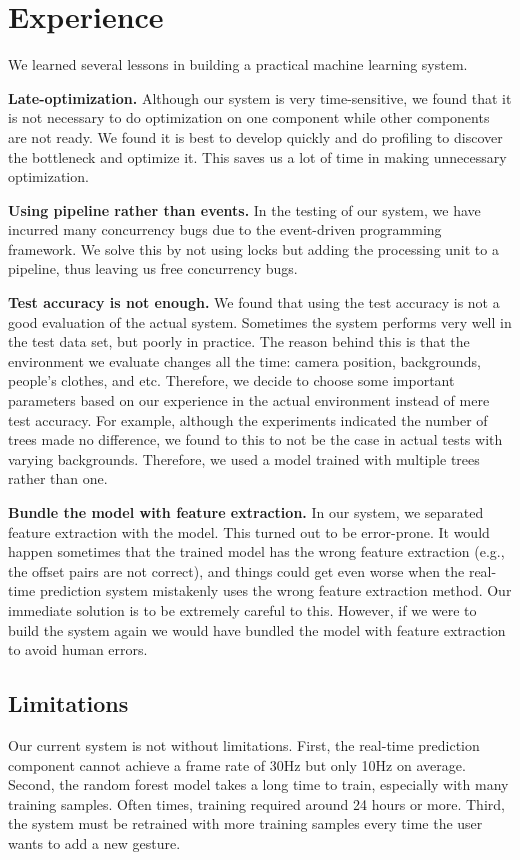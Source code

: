 \section{Experience}
\cutsection
\label{sec: experience}
We learned several lessons in building a practical machine learning system.

\cutequation
\textbf{Late-optimization.} Although our system is very time-sensitive, we found that it is not necessary to do optimization on one component while other components are not ready. We found it is best to develop quickly and do profiling to discover the bottleneck and optimize it. This saves us a lot of time in making unnecessary optimization.   

\cutequation
\textbf{Using pipeline rather than events.} In the testing of our system, we have incurred many concurrency bugs due to the event-driven programming framework. We solve this by not using locks but adding the processing unit to a pipeline, thus leaving us free concurrency bugs.

\cutequation
\textbf{Test accuracy is not enough.} We found that using the test accuracy is not a good evaluation of the actual system. Sometimes the system performs very well in the test data set, but poorly in practice. The reason behind this is that the environment we evaluate changes all the time: camera position, backgrounds, people's clothes, and etc. Therefore, we decide to choose some important parameters based on our experience in the actual environment instead of mere test accuracy. For example, although the experiments indicated the number of trees made no difference, we found to this to not be the case in actual tests with varying backgrounds. Therefore, we used a model trained with multiple trees rather than one.
\cutequation

\textbf{Bundle the model with feature extraction.} In our system, we separated feature extraction with the model. This turned out to be error-prone. It would happen sometimes that the trained model has the wrong feature extraction (e.g., the offset pairs are not correct), and things could get even worse when the real-time prediction system mistakenly uses the wrong feature extraction method. Our immediate solution is to be extremely careful to this. However, if we were to build the system again we would have  bundled the model with feature extraction to avoid human errors.

\cutsubsection
\subsection{Limitations}
\cutsubsection
Our current system is not without limitations. First, the real-time prediction component cannot achieve a frame rate of 30Hz but only 10Hz on average. Second, the random forest model takes a long time to train, especially with many training samples. Often times, training required around 24 hours or more. Third, the system must be retrained with more training samples every time the user wants to add a new gesture. 
